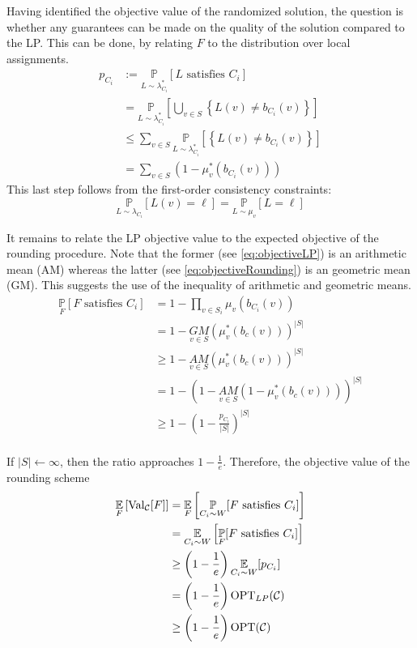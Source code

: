 Having identified the objective value of the randomized solution, the question is whether any guarantees can be made on the quality of the solution compared to the LP. 
This can be done, by relating $F$ to the distribution over local assignments.
\begin{align}
	p_{C_i} &:= \underset{L \sim \lambda_{C_i}^*}{\mathbb{P}} [L \text{ satisfies } C_i] \nonumber\\
			&=  \underset{L \sim \lambda_{C_i}^*}{\mathbb{P}}\left[ \bigcup_{v \in S} \left\{ L(v) \neq b_{C_i}(v) \right\} \right] \nonumber\\
			&\le \sum_{v \in  S } \underset{L \sim \lambda_{C_i}^*}{\mathbb{P}} \left[  \left\{ L(v) \neq b_{C_i}(v) \right\} \right] \nonumber\\
			&= \sum_{v \in S} \left( 1 - \mu_v^*(b_{C_i}(v)) \right) \label{eq:objectiveLP}
\end{align}
This last step follows from the first-order consistency constraints:
\[
	\underset{L \sim \lambda_{C_i} }{\mathbb{P}}[ L(v) = \ell] = \underset{L \sim \mu_v }{\mathbb{P}}[ L = \ell]
\]

It remains to relate the LP objective value to the expected objective of the rounding procedure. 
Note that the former (see \eqref{eq:objectiveLP}) is an arithmetic mean (AM) whereas the latter (see \eqref{eq:objectiveRounding}) is an geometric mean (GM). 
This suggests the use of the inequality of arithmetic and geometric means.
\begin{align*}
		\underset{F}{\mathbb{P}}[ F \text{ satisfies } C_i] &= 1 - \prod_{v \in S_i} \mu_v(b_{C_i}(v))\\
		&= 1 - \underset{v \in S}{GM}(\mu_{v}^*(b_c(v)))^{|S|}\\
		&\ge 1 - \underset{v \in S}{AM}(\mu_{v}^*(b_c(v)))^{|S|}\\
		&= 1 - \left( 1  - \underset{v \in S}{AM}(1 -\mu_{v}^*(b_c(v))) \right)^{|S|}\\
		&\ge 1 - \left( 1  - \frac{p_{C_i}}{|S|}\right)^{|S|}\\
\end{align*}

If $|S| \leftarrow \infty$, then the ratio approaches $1 - \frac{1}{e}$. 
Therefore, the objective value of the rounding scheme
\begin{align*}
	\underset{F}{\mathbb{E}} \left[ \text{Val}_{\mathcal{C}}[F]\right] &= \underset{F}{\mathbb{E}}\left[ \underset{C_i \sim W}{\mathbb{P}}[ F \text{ satisfies } C_i] \right]\\
	&=  \underset{C_i \sim W}{\mathbb{E}}\left[ \underset{F}{\mathbb{P}}[ F \text{ satisfies } C_i] \right]\\
	&\ge \left( 1 - \frac{1}{e} \right) \underset{C_i \sim W}{\mathbb{E}} [ p_{C_i} ]\\
	&= \left( 1 - \frac{1}{e} \right) \text{OPT}_{LP}(\mathcal{C})\\
	&\ge \left( 1 - \frac{1}{e} \right) \text{OPT}(\mathcal{C})\\
\end{align*}

